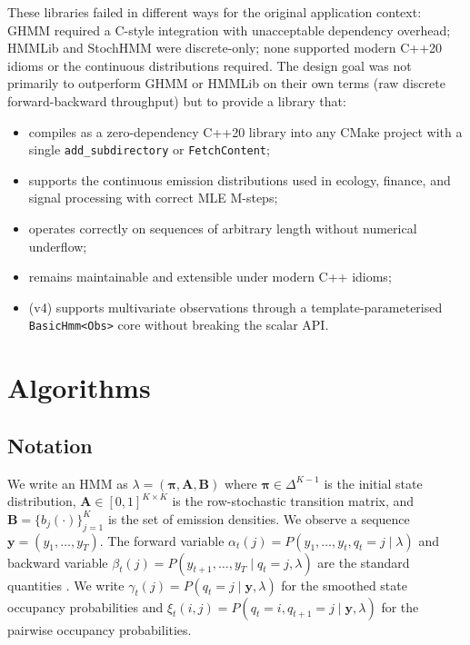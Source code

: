 \documentclass[11pt]{article}
\begin{document}
These libraries failed in different ways for the original application
context: GHMM required a C-style integration with unacceptable dependency
overhead; HMMLib and StochHMM were discrete-only; none supported modern
C++20 idioms or the continuous distributions required.
The design goal was not primarily to outperform GHMM or HMMLib on their
own terms (raw discrete forward-backward throughput) but to provide a
library that:
\begin{itemize}
  \item compiles as a zero-dependency C++20 library into any CMake project
        with a single \texttt{add\_subdirectory} or \texttt{FetchContent};
  \item supports the continuous emission distributions used in ecology,
        finance, and signal processing with correct MLE M-steps;
  \item operates correctly on sequences of arbitrary length without
        numerical underflow;
  \item remains maintainable and extensible under modern C++ idioms;
  \item (v4) supports multivariate observations through a
        template-parameterised \texttt{BasicHmm<Obs>} core
        without breaking the scalar API.
\end{itemize}

\section{Algorithms}
\label{sec:algorithms}

\subsection{Notation}

We write an HMM as $\lambda = (\boldsymbol{\pi}, \mathbf{A}, \mathbf{B})$
where $\boldsymbol{\pi} \in \Delta^{K-1}$ is the initial state distribution,
$\mathbf{A} \in [0,1]^{K \times K}$ is the row-stochastic transition matrix,
and $\mathbf{B} = \{b_j(\cdot)\}_{j=1}^K$ is the set of emission densities.
We observe a sequence $\mathbf{y} = (y_1, \ldots, y_T)$.
The forward variable $\alpha_t(j) = P(y_1, \ldots, y_t, q_t = j \mid \lambda)$
and backward variable $\beta_t(j) = P(y_{t+1}, \ldots, y_T \mid q_t = j, \lambda)$
are the standard quantities \citep{Rabiner1989}.
We write $\gamma_t(j) = P(q_t = j \mid \mathbf{y}, \lambda)$ for the
smoothed state occupancy probabilities and
$\xi_t(i,j) = P(q_t = i, q_{t+1} = j \mid \mathbf{y}, \lambda)$ for the
pairwise occupancy probabilities.
\end{document}
